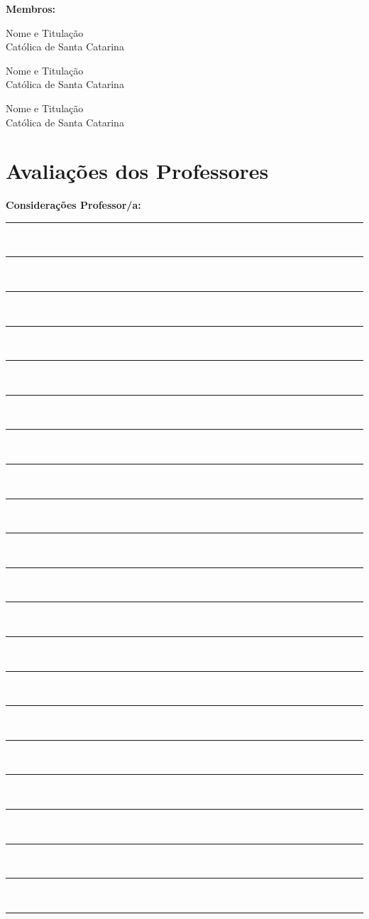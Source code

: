 \documentclass[a4paper,12pt]{article}
\begin{document}
\vspace{2.2cm}

\noindent\textbf{Membros:}

\vspace{1.6cm}

\begin{center}
Nome e Titulação\\
Católica de Santa Catarina
\end{center}

\vspace{1.9cm}

\begin{center}
Nome e Titulação\\
Católica de Santa Catarina
\end{center}

\vspace{1.9cm}

\begin{center}
Nome e Titulação\\
Católica de Santa Catarina
\end{center}


\newpage
\section*{Avaliações dos Professores}
\vspace{1cm}
\textbf{Considerações Professor/a:} \\[0.3cm]
\rule{\textwidth}{0.5pt}\\[0.5cm]
\rule{\textwidth}{0.5pt}\\[0.5cm]
\rule{\textwidth}{0.5pt}\\[0.5cm]
\rule{\textwidth}{0.5pt}\\[0.5cm]
\rule{\textwidth}{0.5pt}\\[0.5cm]
\rule{\textwidth}{0.5pt}\\[0.5cm]
\rule{\textwidth}{0.5pt}\\[0.5cm]
\rule{\textwidth}{0.5pt}\\[0.5cm]
\rule{\textwidth}{0.5pt}\\[0.5cm]
\rule{\textwidth}{0.5pt}\\[0.5cm]
\rule{\textwidth}{0.5pt}\\[0.5cm]
\rule{\textwidth}{0.5pt}\\[0.5cm]
\rule{\textwidth}{0.5pt}\\[0.5cm]
\rule{\textwidth}{0.5pt}\\[0.5cm]
\rule{\textwidth}{0.5pt}\\[0.5cm]
\rule{\textwidth}{0.5pt}\\[0.5cm]
\rule{\textwidth}{0.5pt}\\[0.5cm]
\rule{\textwidth}{0.5pt}\\[0.5cm]
\rule{\textwidth}{0.5pt}\\[0.5cm]
\rule{\textwidth}{0.5pt}\\[0.5cm]
\rule{\textwidth}{0.5pt}\\[0.5cm]
\end{document}
